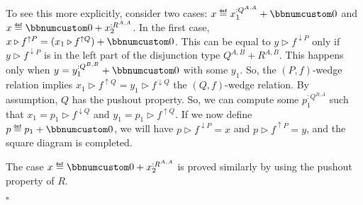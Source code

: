To see this more explicitly, consider two cases: $x\triangleq x_{1}^{:Q^{A,A}}+\bbnum 0$
and $x\triangleq\bbnum 0+x_{2}^{:R^{A,A}}$. In the first case, $x\triangleright f^{\uparrow P}=(x_{1}\triangleright f^{\uparrow Q})+\bbnum 0$.
This can be equal to $y\triangleright f^{\downarrow P}$ only if $y\triangleright f^{\downarrow P}$
is in the left part of the disjunction type $Q^{A,B}+R^{A,B}$. This
happens only when $y=y_{1}^{:Q^{B,B}}+\bbnum 0$ with some $y_{1}$.
So, the $\left(P,f\right)$-wedge relation implies $x_{1}\triangleright f^{\uparrow Q}=y_{1}\triangleright f^{\downarrow Q}$
\textemdash{} the $\left(Q,f\right)$-wedge relation. By assumption,
$Q$ has the pushout property. So, we can compute some $p_{1}^{:Q^{B,A}}$
such that $x_{1}=p_{1}\triangleright f^{\downarrow Q}$ and $y_{1}=p_{1}\triangleright f^{\uparrow Q}$.
If we now define $p\triangleq p_{1}+\bbnum 0$, we will have $p\triangleright f^{\downarrow P}=x$
and $p\triangleright f^{\uparrow P}=y$, and the square diagram is
completed.

The case $x\triangleq\bbnum 0+x_{2}^{:R^{A,A}}$ is proved similarly
by using the pushout property of $R$. %
\begin{comment}
\textbf{(f)} Rewrite the wedge relation for $x^{:S^{A,A,P^{A,A}}}$
and $y^{:S^{B,B,P^{B,B}}}$ by using the explicit liftings to $S$:
\[
x\triangleright f^{\uparrow S^{A,\bullet,P^{A,A}}}\bef\big(\overline{f^{\uparrow P^{A,\bullet}}}\big)^{\uparrow S^{A,B,\bullet}}=y\triangleright f^{\downarrow S^{\bullet,B,P^{B,B}}}\bef\big(\overline{f^{\downarrow P^{\bullet,B}}}\big)^{\uparrow S^{A,B,\bullet}}\quad.
\]
Due to the commutativity law of $S$, we may exchange the order of
compositions here:
\[
f^{\uparrow S^{A,\bullet,P^{A,B}}}\big(x\triangleright(f^{\uparrow P^{A,\bullet}})^{\uparrow S^{A,A,\bullet}}\big)=y\triangleright\big(\overline{f^{\downarrow P^{\bullet,B}}}\big)^{\uparrow S^{B,B,\bullet}}\triangleright f^{\downarrow S^{\bullet,B,P^{A,B}}}\quad.
\]
Now we can use the pushout property of $S$ to obtain some $z:S^{B,A,P^{A,B}}$
such that
\[
x\triangleright\big(\overline{f^{\uparrow P^{A,\bullet}}}\big)^{\uparrow S^{A,A,\bullet}}=z\triangleright f^{\downarrow S^{\bullet,A,P^{A,B}}}\text{ and }y\triangleright\big(\overline{f^{\downarrow P^{\bullet,B}}}\big)^{\uparrow S^{B,B,\bullet}}=z\triangleright f^{\uparrow S^{B,\bullet,P^{A,B}}}\quad.
\]
We need to produce a value $t:S^{B,A,P^{B,A}}$ such that 
\[
x=t\triangleright f^{\downarrow S^{\bullet,A,P^{B,A}}}\bef\big(\overline{f^{\downarrow P^{\bullet,A}}}\big)^{\uparrow S^{A,A,\bullet}}\text{ and }y=t\triangleright f^{\uparrow S^{B,\bullet,P^{B,A}}}\bef\big(\overline{f^{\uparrow P^{B,\bullet}}}\big)^{\uparrow S^{B,B,\bullet}}\quad.
\]
\end{comment}
$\square$

